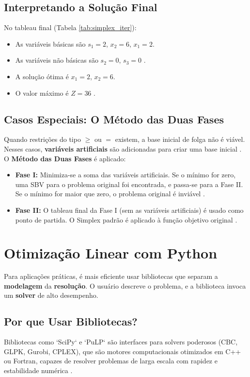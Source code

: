 \documentclass[conference]{IEEEtran}
\begin{document}
\subsection{Interpretando a Solução Final}
No tableau final (Tabela \ref{tab:simplex_iter}):
\begin{itemize}
    \item As variáveis básicas são $s_1=2$, $x_2=6$, $x_1=2$.
    \item As variáveis não básicas são $s_2=0$, $s_3=0$ \cite{menezes}.
    \item A solução ótima é $x_1 = 2$, $x_2 = 6$.
    \item O valor máximo é $Z = 36$ \cite{menezes, silva2017}.
\end{itemize}

\subsection{Casos Especiais: O Método das Duas Fases}
Quando restrições do tipo $\ge$ ou $=$ existem, a base inicial de folga não é viável. Nesses casos, \textbf{variáveis artificiais} são adicionadas para criar uma base inicial \cite{milhomem, silva2017}. O \textbf{Método das Duas Fases} é aplicado:

\begin{itemize}
    \item \textbf{Fase I:} Minimiza-se a soma das variáveis artificiais. Se o mínimo for zero, uma SBV para o problema original foi encontrada, e passa-se para a Fase II. Se o mínimo for maior que zero, o problema original é inviável \cite{schneider, silva2017}.
    \item \textbf{Fase II:} O tableau final da Fase I (sem as variáveis artificiais) é usado como ponto de partida. O Simplex padrão é aplicado à função objetivo original \cite{schneider}.
\end{itemize}


\section{Otimização Linear com  Python }
Para aplicações práticas, é mais eficiente usar bibliotecas que separam a \textbf{modelagem} da \textbf{resolução}. O usuário descreve o problema, e a biblioteca invoca um \textbf{solver} de alto desempenho.

\subsection{Por que Usar Bibliotecas? }
Bibliotecas como `SciPy` e `PuLP` são interfaces para solvers poderosos (CBC, GLPK, Gurobi, CPLEX), que são motores computacionais otimizados em C++ ou Fortran, capazes de resolver problemas de larga escala com rapidez e estabilidade numérica \cite{cordeiro}.
\end{document}
